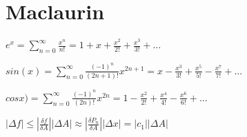 \documentclass[12pt,a4paper]{article}
\begin{document}
\section{Maclaurin}

$ e^x = \sum_{n=0}^{\infty} \frac{x^n}{n!} = 1 + x + \frac{x^2}{2!} + \frac{x^3}{3!} + \ldots $

$ sin(x) = \sum_{n=0}^{\infty} \frac{(-1)^n}{(2n+1)!} x^{2n+1} = x - \frac{x^3}{3!} + \frac{x^5}{5!} - \frac{x^7}{7!} + \ldots$

$ cosx) = \sum_{n=0}^{\infty} \frac{(-1)^n}{(2n)!} x^{2n} = 1 - \frac{x^2}{2!} + \frac{x^4}{4!} - \frac{x^6}{6!} + \ldots$

$|\Delta f| \leq |\frac{\delta f}{\delta A}| |\Delta A| \approx |\frac{\delta P_n}{\delta A}| |\Delta x| = |c_1||\Delta A|$ 
\end{document}

